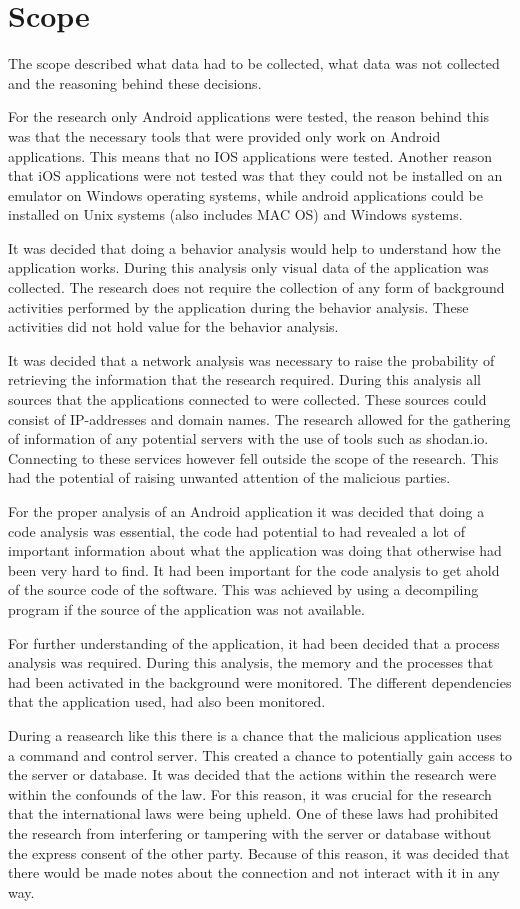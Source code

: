 \section{Scope}

The scope described what data had to be collected, what data was not collected and the reasoning behind these decisions.

For the research only Android applications were tested, the reason behind this was that the necessary tools that were provided only work on Android applications. This means that no IOS applications were tested. Another reason that iOS applications were not tested was that they could not be installed on an emulator on Windows operating systems, while android applications could be installed on Unix systems (also includes MAC OS) and Windows systems.

It was decided that doing a behavior analysis would help to understand how the application works. During this analysis only visual data of the application was collected. The research does not require the collection of any form of background activities performed by the application during the behavior analysis. These activities did not hold value for the behavior analysis.

It was decided that a network analysis was necessary to raise the probability of retrieving the information that the research required. During this analysis all sources that the applications connected to were collected. These sources could consist of IP-addresses and domain names. The research allowed for the gathering of information of any potential servers with the use of tools such as shodan.io. Connecting to these services however fell outside the scope of the research. This had the potential of raising unwanted attention of the malicious parties.

For the proper analysis of an Android application it was decided that doing a code analysis was essential, the code had potential to had revealed a lot of important information about what the application was doing that otherwise had been very hard to find. It had been important for the code analysis to get ahold of the source code of the software. This was achieved by using a decompiling program if the source of the application was not available.

For further understanding of the application, it had been decided that a process analysis was required. During this analysis, the memory and the processes that had been activated in the background were monitored. The different dependencies that the application used, had also been monitored.

During a reasearch like this there is a chance that the malicious application uses a command and control server. This created a chance to potentially gain access to the server or database. It was decided that the actions within the research were within the confounds of the law. For this reason, it was crucial for the research that the international laws were being upheld. One of these laws had prohibited the research from interfering or tampering with the server or database without the express consent of the other party. Because of this reason, it was decided that there would be made notes about the connection and not interact with it in any way.
